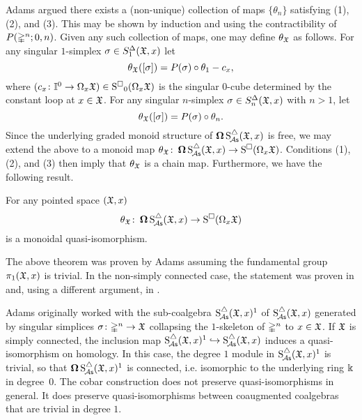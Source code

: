 Adams argued there exists a (non-unique) collection of maps $\{\theta_n\}$ satisfying (1), (2), and (3). This may be shown by induction and using the contractibility of $P(\mathbb{\Delta}^n; 0,n)$. Given any such collection of maps, one may define $\theta_{\mathfrak{X}}$ as follows. For any singular $1$-simplex $\sigma \in S^{\Delta}_1(\mathfrak{X},x)$ let
\[
\theta_{\mathfrak{X}}([\sigma]) = P(\sigma) \circ \theta_1 - c_x,
\]
where $(c_x \colon \mathbb{I}^0 \to \Omega_x\mathfrak{X}) \in \operatorname{S^{\square}}_0(\Omega_x \mathfrak{X})$ is the singular $0$-cube determined by the constant loop at $x \in \mathfrak{X}$.
For any singular $n$-simplex $\sigma \in S^{\Delta}_n(\mathfrak{X},x)$ with $n>1$, let
\[
\theta_{\mathfrak{X}}([\sigma]) = P(\sigma) \circ \theta_n.
\]
Since the underlying graded monoid structure of $\operatorname{\mathbf{\Omega}} \operatorname{S^{\triangle}_{\!{\mathcal{A}\mathsf{s}}}}(\mathfrak{X},x)$ is free, we may extend the above to a monoid map $\theta_{\mathfrak{X}} \colon \operatorname{\mathbf{\Omega}} \operatorname{S^{\triangle}_{\!{\mathcal{A}\mathsf{s}}}}(\mathfrak{X},x) \to \operatorname{S^{\square}}(\Omega_x \mathfrak{X})$.
Conditions (1), (2), and (3) then imply that $\theta_{\mathfrak{X}}$ is a chain map.
Furthermore, we have the following result.

\begin{proposition}
	For any pointed space $(\mathfrak{X},x)$
	\[
	\theta_{\mathfrak{X}} \colon \operatorname{\mathbf{\Omega}} \operatorname{S^{\triangle}_{\!{\mathcal{A}\mathsf{s}}}}(\mathfrak{X},x) \to \operatorname{S^{\square}}(\Omega_x \mathfrak{X})
	\]
	is a monoidal quasi-isomorphism.
\end{proposition}

The above theorem was proven by Adams assuming the fundamental group $\pi_1(\mathfrak{X},x)$ is trivial. In the non-simply connected case, the statement was proven in \cite{rivera2018rigidification} and, using a different argument, in \cite{rivera2019path}.

\begin{remark}
  Adams originally worked with the sub-coalgebra $\operatorname{S^{\triangle}_{\!{\mathcal{A}\mathsf{s}}}}(\mathfrak{X},x)^1$ of $\operatorname{S^{\triangle}_{\!{\mathcal{A}\mathsf{s}}}}(\mathfrak{X},x)$ generated by singular simplices $\sigma \colon \mathbb{\Delta}^n \to \mathfrak{X}$ collapsing the $1$-skeleton of $\mathbb{\Delta}^n$ to $x \in \mathfrak{X}$. If $\mathfrak{X}$ is simply connected, the inclusion map $\operatorname{S^{\triangle}_{\!{\mathcal{A}\mathsf{s}}}}(\mathfrak{X},x)^1 \hookrightarrow \operatorname{S^{\triangle}_{\!{\mathcal{A}\mathsf{s}}}}(\mathfrak{X},x)$ induces a quasi-isomorphism on homology. In this case, the degree $1$ module in $\operatorname{S^{\triangle}_{\!{\mathcal{A}\mathsf{s}}}}(\mathfrak{X},x)^1$ is trivial, so that $\operatorname{\mathbf{\Omega}} \operatorname{S^{\triangle}_{\!{\mathcal{A}\mathsf{s}}}}(\mathfrak{X},x)^1$ is connected, i.e. isomorphic to the underlying ring $\Bbbk$ in degree~$0$. The cobar construction does not preserve quasi-isomorphisms in general. It does preserve quasi-isomorphisms between coaugmented coalgebras that are trivial in degree $1$.
\end{remark}


